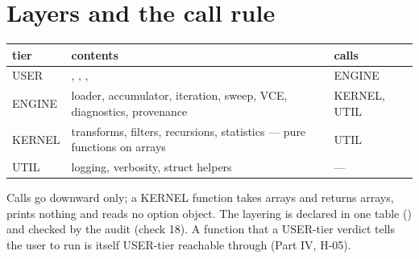 \section{Layers and the call rule}

\begin{tabular}{@{}P{16mm}P{104mm}P{34mm}@{}}
\toprule
tier & contents & calls\\
\midrule
USER & , , ,  & ENGINE\\
ENGINE & loader, accumulator, iteration, sweep, VCE, diagnostics, provenance & KERNEL, UTIL\\
KERNEL & transforms, filters, recursions, statistics --- pure functions on arrays & UTIL\\
UTIL & logging, verbosity, struct helpers & ---\\
\bottomrule
\end{tabular}

Calls go downward only; a KERNEL function takes arrays and returns arrays, prints nothing and reads no option object. The layering is declared in one table () and checked by the audit (check 18). A function that a USER-tier verdict tells the user to run is itself USER-tier reachable through  (Part IV, H-05).
